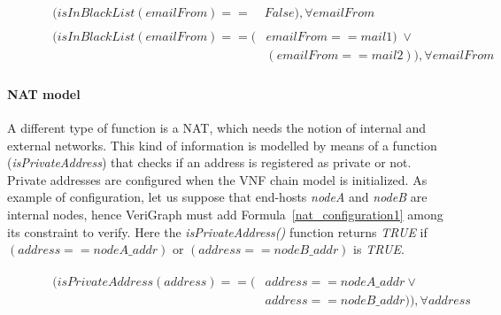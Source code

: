 	\begin{figure}[h]
		{\footnotesize
			\begin{subequations}
				\begin{align}
					\begin{split}
						\label{anti-spam_configuration1}
						(isInBlackList(emailFrom) == \;& False), \forall emailFrom
					\end{split} \\
					\begin{split}
						\label{anti-spam_configuration2}
						(isInBlackList(emailFrom) == (& emailFrom == mail1) \; \vee \\
						& (emailFrom == mail2)), \forall emailFrom
					\end{split}
				\end{align}
			\end{subequations}
		}%
	\end{figure}


\paragraph{NAT model}
A different type of function is a NAT, which needs the notion of internal and external networks. This kind of information is modelled by means of a function (\textit{isPrivateAddress}) that checks if an address is registered as private or not. Private addresses are configured when the VNF chain model is initialized. As example of configuration, let us suppose that end-hosts \textit{nodeA} and \textit{nodeB} are internal nodes, hence VeriGraph must add Formula~\ref{nat_configuration1} among its constraint to verify. Here the \textit{isPrivateAddress()} function returns \textit{TRUE} if \textit{$( address == nodeA\_addr)$} or \textit{$(address == nodeB\_addr)$} is \textit{TRUE}.
\begin{figure}[h]
	{\footnotesize
		\begin{subequations}
			\begin{align}
				\begin{split}
					\label{nat_configuration1}
					(isPrivateAddress(address) == (& address == nodeA\_addr \vee \\
					& address == nodeB\_addr)), \forall address
				\end{split}
			\end{align}
		\end{subequations}
	}%
\end{figure}

